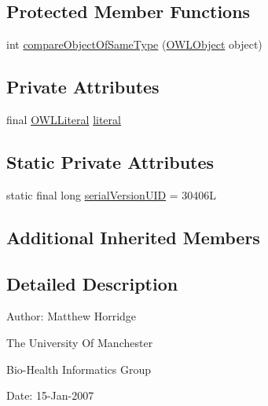 \subsection*{Protected Member Functions}
\begin{DoxyCompactItemize}
\item 
int \hyperlink{classuk_1_1ac_1_1manchester_1_1cs_1_1owl_1_1owlapi_1_1_s_w_r_l_literal_argument_impl_a47475eae729228438d5915422aa8f890}{compare\-Object\-Of\-Same\-Type} (\hyperlink{interfaceorg_1_1semanticweb_1_1owlapi_1_1model_1_1_o_w_l_object}{O\-W\-L\-Object} object)
\end{DoxyCompactItemize}
\subsection*{Private Attributes}
\begin{DoxyCompactItemize}
\item 
final \hyperlink{interfaceorg_1_1semanticweb_1_1owlapi_1_1model_1_1_o_w_l_literal}{O\-W\-L\-Literal} \hyperlink{classuk_1_1ac_1_1manchester_1_1cs_1_1owl_1_1owlapi_1_1_s_w_r_l_literal_argument_impl_abb5feeffba3b08ef31fcd4bfc45caab0}{literal}
\end{DoxyCompactItemize}
\subsection*{Static Private Attributes}
\begin{DoxyCompactItemize}
\item 
static final long \hyperlink{classuk_1_1ac_1_1manchester_1_1cs_1_1owl_1_1owlapi_1_1_s_w_r_l_literal_argument_impl_ae6a0861d868cf4d6d1ea2dcad73c3f43}{serial\-Version\-U\-I\-D} = 30406\-L
\end{DoxyCompactItemize}
\subsection*{Additional Inherited Members}


\subsection{Detailed Description}
Author\-: Matthew Horridge\par
 The University Of Manchester\par
 Bio-\/\-Health Informatics Group\par
 Date\-: 15-\/\-Jan-\/2007\par
\par
 

